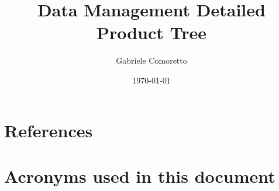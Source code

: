 \documentclass[DM,authoryear,toc]{lsstdoc}
\title{Data Management Detailed Product Tree}
\author{%
Gabriele Comoretto
}
\date{\today}
\begin{document}
\providecommand{\tightlist}{%
  \setlength{\itemsep}{0pt}\setlength{\parskip}{0pt}}


\maketitle




\newpage
\appendix
\section{References} \label{sec:bib}


\section{Acronyms used in this document}\label{sec:acronyms}

\end{document}

